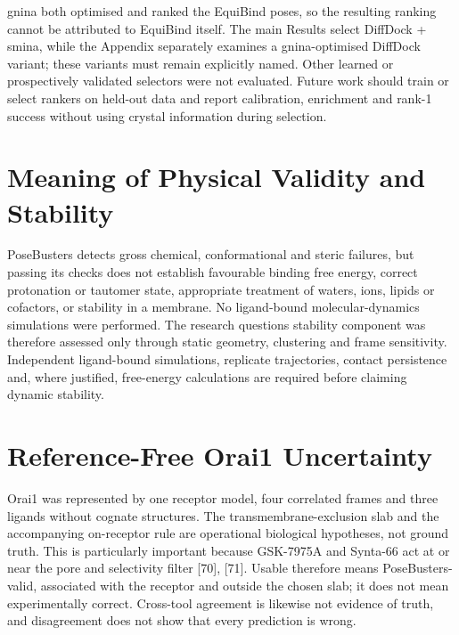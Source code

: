 gnina both optimised and ranked the EquiBind poses, so the resulting ranking cannot be attributed to EquiBind itself. The main Results select DiffDock + smina, while the Appendix separately examines a gnina-optimised DiffDock variant; these variants must remain explicitly named. Other learned or prospectively validated selectors were not evaluated. Future work should train or select rankers on held-out data and report calibration, enrichment and rank-1 success without using crystal information during selection.

\hypertarget{meaning-of-physical-validity-and-stability}{%
\section{Meaning of Physical Validity and Stability}\label{meaning-of-physical-validity-and-stability}}

PoseBusters detects gross chemical, conformational and steric failures, but passing its checks does not establish favourable binding free energy, correct protonation or tautomer state, appropriate treatment of waters, ions, lipids or cofactors, or stability in a membrane. No ligand-bound molecular-dynamics simulations were performed. The research question\textquotesingle s stability component was therefore assessed only through static geometry, clustering and frame sensitivity. Independent ligand-bound simulations, replicate trajectories, contact persistence and, where justified, free-energy calculations are required before claiming dynamic stability.

\hypertarget{reference-free-orai1-uncertainty}{%
\section{Reference-Free Orai1 Uncertainty}\label{reference-free-orai1-uncertainty}}

Orai1 was represented by one receptor model, four correlated frames and three ligands without cognate structures. The transmembrane-exclusion slab and the accompanying on-receptor rule are operational biological hypotheses, not ground truth. This is particularly important because GSK-7975A and Synta-66 act at or near the pore and selectivity filter {[}70{]}, {[}71{]}. Usable therefore means PoseBusters-valid, associated with the receptor and outside the chosen slab; it does not mean experimentally correct. Cross-tool agreement is likewise not evidence of truth, and disagreement does not show that every prediction is wrong.

